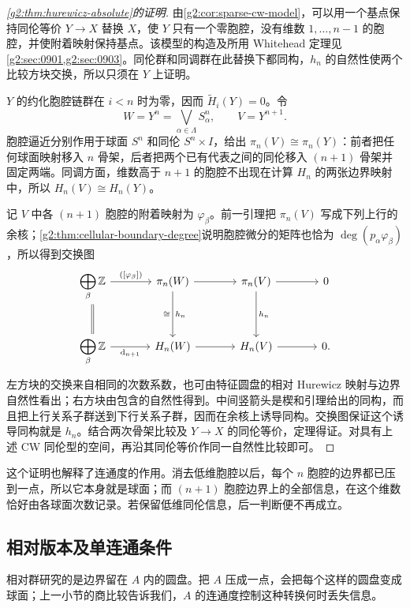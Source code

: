 \begin{proof}[\cref{g2:thm:hurewicz-absolute}的证明]
	由\cref{g2:cor:sparse-cw-model}，可以用一个基点保持同伦等价 \(Y\to X\) 替换 \(X\)，使 \(Y\) 只有一个零胞腔，没有维数 \(1,\ldots,n-1\) 的胞腔，并使附着映射保持基点。该模型的构造及所用 Whitehead 定理见\cref{g2:sec:0901,g2:sec:0903}。同伦群和同调群在此替换下都同构，\(h_n\) 的自然性使两个比较方块交换，所以只须在 \(Y\) 上证明。

	\(Y\) 的约化胞腔链群在 \(i<n\) 时为零，因而 \(\widetilde H_i(Y)=0\)。令
	\[
		W=Y^n=\bigvee_{\alpha\in\Lambda}S^n_\alpha,\qquad V=Y^{n+1}.
	\]
	胞腔逼近分别作用于球面 \(S^n\) 和同伦 \(S^n\times I\)，给出 \(\pi_n(V)\cong\pi_n(Y)\)：前者把任何球面映射移入 \(n\) 骨架，后者把两个已有代表之间的同伦移入 \((n+1)\) 骨架并固定两端。同调方面，维数高于 \(n+1\) 的胞腔不出现在计算 \(H_n\) 的两张边界映射中，所以 \(H_n(V)\cong H_n(Y)\)。

	记 \(V\) 中各 \((n+1)\) 胞腔的附着映射为 \(\varphi_\beta\)。前一引理把 \(\pi_n(V)\) 写成下列上行的余核；\cref{g2:thm:cellular-boundary-degree}说明胞腔微分的矩阵也恰为 \(\deg(p_\alpha\varphi_\beta)\)，所以得到交换图
	\[
		\begin{tikzcd}[column sep=large,row sep=large]
			\displaystyle\bigoplus_\beta\mathbb Z \arrow[r,"{([\varphi_\beta])}"] \arrow[d,equal] & \pi_n(W) \arrow[r] \arrow[d,"h_n","\cong"'] & \pi_n(V) \arrow[r] \arrow[d,"h_n"] & 0 \\
			\displaystyle\bigoplus_\beta\mathbb Z \arrow[r,"\mathrm d_{n+1}"'] & H_n(W) \arrow[r] & H_n(V) \arrow[r] & 0.
		\end{tikzcd}
	\]
	左方块的交换来自相同的次数系数，也可由特征圆盘的相对 Hurewicz 映射与边界自然性看出；右方块由包含的自然性得到。中间竖箭头是楔和引理给出的同构，而且把上行关系子群送到下行关系子群，因而在余核上诱导同构。交换图保证这个诱导同构就是 \(h_n\)。结合两次骨架比较及 \(Y\to X\) 的同伦等价，定理得证。对具有上述 CW 同伦型的空间，再沿其同伦等价作同一自然性比较即可。
\end{proof}

这个证明也解释了连通度的作用。消去低维胞腔以后，每个 \(n\) 胞腔的边界都已压到一点，所以它本身就是球面；而 \((n+1)\) 胞腔边界上的全部信息，在这个维数恰好由各球面次数记录。若保留低维同伦信息，后一判断便不再成立。

\subsection{相对版本及单连通条件}
\label{g2:subsec:0902:04}

相对群研究的是边界留在 \(A\) 内的圆盘。把 \(A\) 压成一点，会把每个这样的圆盘变成球面；上一小节的商比较告诉我们，\(A\) 的连通度控制这种转换何时丢失信息。

